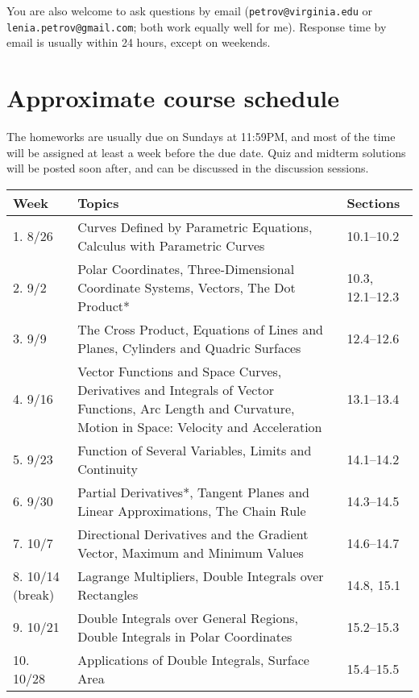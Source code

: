 \documentclass[oneside,11pt]{amsart}
\begin{document}
You are also welcome to ask questions by email (\texttt{petrov@virginia.edu} or
\texttt{lenia.petrov@gmail.com}; both work equally well for me). Response time by email is usually within 24 hours, except on weekends.

\section{Approximate course schedule}

The homeworks are usually due on Sundays at 11:59PM, and most of the time will be assigned at least a week before the due date. Quiz and midterm solutions will be posted soon after, and can be discussed in the discussion sessions.


\vspace{5pt}


\begin{center}
\begin{longtable}{|l|p{}|l|}
    \hline
    \textbf{Week} & \textbf{Topics} & \textbf{Sections} \\
    \hline
    1. 8/26 & Curves Defined by Parametric Equations, Calculus with Parametric Curves & 10.1--10.2 \\
    \hline
    2. 9/2 & Polar Coordinates, Three-Dimensional Coordinate Systems, Vectors, The Dot Product* & 10.3, 12.1--12.3 \\
    \hline
    3. 9/9 & The Cross Product, Equations of Lines and Planes, Cylinders and Quadric Surfaces & 12.4--12.6 \\
    \hline
		4. 9/16 & Vector Functions and Space Curves, Derivatives and Integrals of Vector Functions, Arc Length and Curvature,
		 Motion in Space: Velocity and Acceleration& 13.1--13.4 \\
    \hline
    5. 9/23 & Function of Several Variables, Limits and Continuity & 14.1--14.2 \\
    \hline
    6. 9/30 & Partial Derivatives*, Tangent Planes and Linear Approximations, The Chain Rule & 14.3--14.5 \\
    \hline
    7. 10/7 & Directional Derivatives and the Gradient Vector, Maximum and Minimum Values & 14.6--14.7 \\
    \hline
		8. 10/14 (break) & Lagrange Multipliers, Double Integrals over Rectangles & 14.8, 15.1 \\
    \hline
    9. 10/21 & Double Integrals over General Regions, Double Integrals in Polar Coordinates & 15.2--15.3 \\
    \hline
    10. 10/28 & Applications of Double Integrals, Surface Area & 15.4--15.5 \\

\end{longtable}
\end{center}
\end{document}
